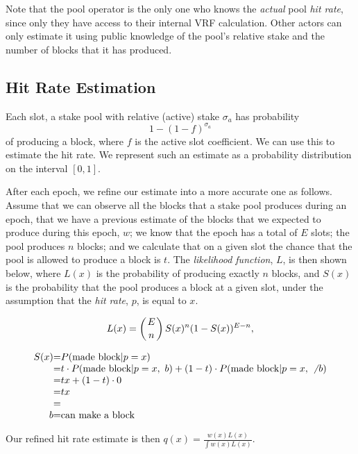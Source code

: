 \documentclass[11pt,a4paper,dvipsnames,twosided]{article}
\begin{document}
Note that the pool operator is the only one who knows the \emph{actual} pool
\emph{hit rate}, since only they have access to their internal VRF calculation.
Other actors can only estimate it using public knowledge of the
pool's relative stake and the number of blocks that it has produced.

\subsection{Hit Rate Estimation}

Each slot, a stake pool with relative (active) stake $\sigma_a$ has probability
\[ 1 - (1-f)^{\sigma_a} \]
of producing a block, where $f$ is the active slot coefficient.
We can use this to estimate the hit rate.
%
We represent such an estimate as a probability distribution on the interval $[0,1]$.

After each epoch, we refine our estimate into a more accurate one as follows.
%
Assume that we can
observe all the blocks that a stake pool produces during an epoch, that we have a previous estimate of the blocks that
we expected to produce during this epoch, $w$; we know that the
epoch has a total of $E$ slots; the pool produces $n$ blocks; and we calculate that on a given slot
the chance that the pool is allowed to produce a block is $t$.
%
The \emph{likelihood function}, $L$, is then shown below, where $L(x)$ is the probability of producing exactly $n$ blocks,
and $S(x)$ is the probability that the pool produces a block at a given slot, under the assumption that the
\emph{hit rate}, $p$, is equal to $x$.

\[ L(x) = \left( E \atop n \right) S(x)^{n} (1-S(x))^{E - n}, \]

\[
\begin{array}{r@{=}l}
S(x) & P( \text{made block} | p = x) \\
     & t \cdot P( \text{made block} | p = x,~b) + (1-t) \cdot P( \text{made block} | p = x,~\not~b) \\
     & tx                              + (1-t) \cdot 0 \\
     & tx \\
\\
b    & \text{can make a block}
\end{array}
\]

Our refined hit rate estimate is then $q(x) = \frac{w(x)L(x)}{\int w(x)L(x)}$.
\end{document}
